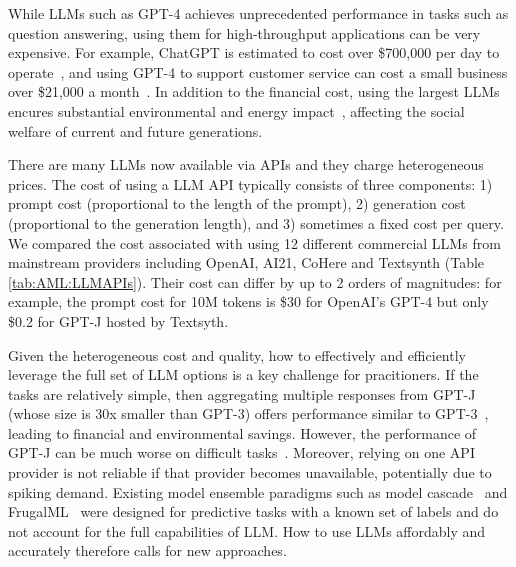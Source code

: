 \documentclass{article}
\begin{document}
While LLMs such as GPT-4 achieves unprecedented performance in tasks such as question answering, using them for high-throughput applications can be very expensive. For example, ChatGPT is estimated to cost over \$700,000 per day to operate~\cite{CostEstChatGPT}, and using GPT-4 to support customer service can cost a small business over \$21,000 a month~\cite{CostEstGPT3}. In addition to the financial cost, using the largest LLMs encures substantial environmental and energy impact~\cite{bender2021dangers,wu2022sustainable}, affecting the social welfare of current and future generations. 


There are many LLMs now available via APIs and they charge heterogeneous prices. 
The cost of using a LLM API typically 
 consists of three components: 1) prompt cost (proportional to the length of the prompt), 2) generation cost (proportional to the generation length), and 3) sometimes a fixed cost per query. We  compared the cost associated with using 12 different commercial LLMs from mainstream providers including OpenAI, AI21, CoHere and Textsynth (Table \ref{tab:AML:LLMAPIs}). Their cost can differ by up to 2 orders of magnitudes: for example,  the prompt cost for 10M tokens is \$30 for OpenAI's GPT-4 but only \$0.2 for GPT-J hosted by Textsyth.

Given the heterogeneous cost and quality, how to effectively and efficiently leverage the full set of LLM options is a key challenge for pracitioners. 
If the tasks are relatively simple, then aggregating multiple responses from GPT-J~\cite{wang2021gpt} (whose size is 30x smaller than GPT-3) offers performance similar to GPT-3~\cite{arora2022ask}, leading to financial and environmental savings.
However, the  performance of GPT-J can be much worse on difficult tasks~\cite{touvron2023llama}. Moreover, relying on one API provider is not reliable if that provider becomes unavailable, potentially due to spiking demand.
Existing model ensemble paradigms such as model cascade~\cite{viola2004robust,wang2011cascade} and  FrugalML~\cite{chen2020frugalml,chen2022efficient} were designed for predictive tasks with a known set of labels and do not account for the full capabilities of LLM.
How to use LLMs affordably and accurately therefore calls for new approaches.
\end{document}
